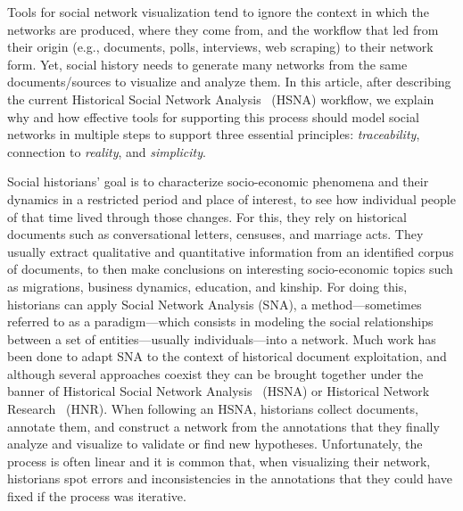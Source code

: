 
Tools for social network visualization tend to ignore the context in which the networks are produced, where they come from, and the workflow that led from their origin (e.g., documents, polls, interviews, web scraping) to their network form. Yet, social history needs to generate many networks from the same documents/sources to visualize and analyze them.
In this article, after describing the current Historical Social Network Analysis~\cite{wetherell_historical_1998} (HSNA) workflow, we explain why and how effective tools for supporting this process should model social networks in multiple steps to support three essential principles: \emph{traceability}, connection to \emph{reality}, and \emph{simplicity}.

Social historians' goal is to characterize socio-economic phenomena and their dynamics in a restricted period and place of interest, to see how individual people of that time lived through those changes. For this, they rely on historical documents such as conversational letters, censuses, and marriage acts. They usually extract qualitative and quantitative information from an identified corpus of documents, to then make conclusions on interesting socio-economic topics such as migrations, business dynamics, education, and kinship.
For doing this, historians can apply Social Network Analysis (SNA), a method---sometimes referred to as a paradigm---which consists in modeling the social relationships between a set of entities---usually individuals---into a network. Much work has been done to adapt SNA to the context of historical document exploitation, and although several approaches coexist they can be brought together under the banner of Historical Social Network Analysis~\cite{wetherell_historical_1998} (HSNA) or Historical Network Research~\cite{kerschbaumerPowerNetworksProspects2015} (HNR).
When following an HSNA, historians collect documents, annotate them, and construct a network from the annotations that they finally analyze and visualize to validate or find new hypotheses.
Unfortunately, the process is often linear and it is common that, when visualizing their network, historians spot errors and inconsistencies in the annotations that they could have fixed if the process was iterative.


